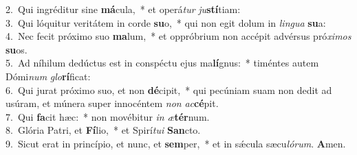 {2.~}Qui ingréditur sine \textbf{má}cula,~* et operá\textit{tur} \textit{ju}\textbf{stí}tiam:\\
{3.~}Qui lóquitur veritátem in corde \textbf{su}o,~* qui non egit dolum in \textit{lin}\textit{gua} \textbf{su}a:\\
{4.~}Nec fecit próximo suo \textbf{ma}lum,~* et oppróbrium non accépit advérsus pró\textit{xi}\textit{mos} \textbf{su}os.\\
{5.~}Ad níhilum dedúctus est in conspéctu ejus ma\textbf{lí}gnus:~* timéntes autem Dómi\textit{num} \textit{glo}\textbf{rí}ficat:\\
{6.~}Qui jurat próximo suo, et non \textbf{dé}cipit,~* qui pecúniam suam non dedit ad usúram, et múnera super innocéntem \textit{non} \textit{ac}\textbf{cé}pit.\\
{7.~}Qui \textbf{fa}cit hæc:~* non movébitur \textit{in} \textit{æ}\textbf{tér}num.\\
{8.~}Glória Patri, et \textbf{Fí}lio,~* et Spirí\textit{tu}\textit{i} \textbf{San}cto.\\
{9.~}Sicut erat in princípio, et nunc, et \textbf{sem}per,~* et in sǽcula sæcu\textit{ló}\textit{rum}. \textbf{A}men.\\
